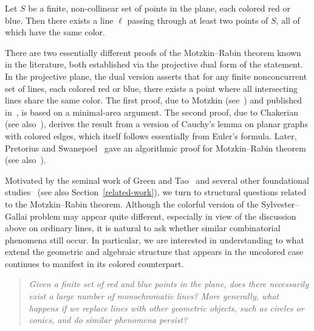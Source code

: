 \documentclass[a4paper,11pt,leqno]{article}
\begin{document}
\begin{theorem}\label{thm:MR}
Let $S$ be a finite, non-collinear set of points in the plane, each colored red or blue.  
Then there exists a line $\ell$ passing through at least two points of $S$, all of which have the same color.
\end{theorem}

There are two essentially different proofs of the Motzkin--Rabin theorem known in the literature, both established via the projective dual form of the statement.  
In the projective plane, the dual version asserts that for any finite nonconcurrent set of lines, each colored red or blue, there exists a point where all intersecting lines share the same color.  
The first proof, due to Motzkin (see~\cite{grunbaum1999monochromatic}) and published in~\cite{borwein1990survey, erdHos1996extremal}, is based on a minimal-area argument.  
The second proof, due to Chakerian~\cite{chakerian1970sylvester} (see also~\cite{edmonds1980solution}), derives the result from a version of Cauchy’s lemma on planar graphs with colored edges, which itself follows essentially from Euler’s formula. Later, Pretorius and Swanepoel~\cite{pretorius2004algorithmic} gave an algorithmic proof for Motzkin--Rabin theorem (see also~\cite{coxeter1948problem}). 

Motivated by the seminal work of Green and Tao~\cite{greentao2013} and several other foundational studies~\cite{burr1974orchard, melchior1941vielseite, kelly1958number, van2007enumerating, elekes2000convexity, csimasawyer1993, crowe1968sylvester} (see also Section~\ref{related-work}), we turn to structural questions related to the Motzkin–Rabin theorem.
Although the colorful version of the Sylvester–Gallai problem may appear quite different, especially in view of the discussion above on ordinary lines, it is natural to ask whether similar combinatorial phenomena still occur.
In particular, we are interested in understanding to what extend the geometric and algebraic structure that appears in the uncolored case continues to manifest in its colored counterpart.


\begin{quote}
\begin{center}
\emph{Given a finite set of red and blue points in the plane, does there necessarily exist a large number of monochromatic lines? More generally, what happens if we replace lines with other geometric objects, such as circles or conics, and do similar phenomena persist?}
\end{center}
\end{quote}
\end{document}
